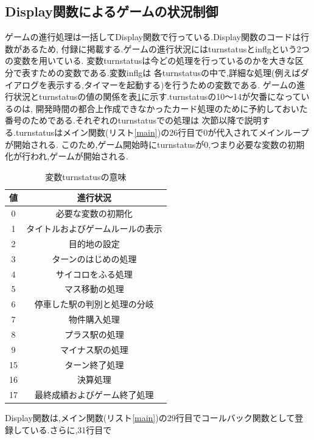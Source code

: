 \documentclass[a4j]{jarticle}
\begin{document}
    \subsection{Display関数によるゲームの状況制御}
    ゲームの進行処理は一括してDisplay関数で行っている.Display関数のコードは行数があるため,
    付録に掲載する.ゲームの進行状況にはturnstatusとinflgという2つの変数を用いている.
    変数turnstatusは今どの処理を行っているのかを大きな区分で表すための変数である.変数inflgは
    各turnstatusの中で,詳細な処理(例えばダイアログを表示する,タイマーを起動する)を行うための変数である.
    ゲームの進行状況とturnstatusの値の関係を表\ref{turnstatus}に示す.turnstatusの10～14が欠番になっているのは,
    開発時間の都合上作成できなかったカード処理のために予約しておいた番号のためである.それぞれのturnstatusでの処理は
    次節以降で説明する.turnstatusはメイン関数(リスト\ref{main})の26行目で0が代入されてメインループが開始される.
    このため,ゲーム開始時にturnstatusが0,つまり必要な変数の初期化が行われ,ゲームが開始される.
    \begin{table}[H]
      \caption{変数turnstatusの意味}
    \label{turnstatus}
    \begin{center}
        \begin{tabular}{c|c}\hline
        値 & 進行状況 \\ \hline \hline
        0 & 必要な変数の初期化 \\ 
        1 & タイトルおよびゲームルールの表示 \\
        2 & 目的地の設定 \\
        3 & ターンのはじめの処理 \\
        4 & サイコロをふる処理 \\
        5 & マス移動の処理 \\
        6 & 停車した駅の判別と処理の分岐 \\
        7 & 物件購入処理 \\
        8 & プラス駅の処理 \\
        9 & マイナス駅の処理 \\
        15 & ターン終了処理 \\
        16 & 決算処理 \\
        17 & 最終成績およびゲーム終了処理 \\ \hline
        \end{tabular}
    \end{center}
    \end{table}
    Display関数は,メイン関数(リスト\ref{main})の29行目でコールバック関数として登録している.さらに,31行目で
\end{document}
